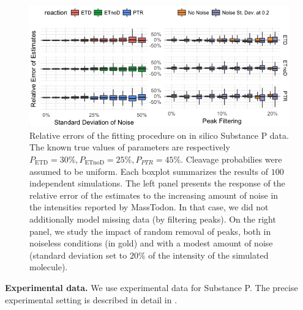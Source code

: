 \documentclass{llncs}
\begin{document}
        \begin{figure}[h]
                \center
                \includegraphics[width=\textwidth]{kokos.png}
                \caption{ Relative errors of the fitting procedure on in silico Substance P data. The known true values of parameters are respectively $P_\text{ETD}=30\%, P_\text{ETnoD}= 25\%, P_{PTR}= 45\%$. Cleavage probabilies were assumed to be uniform. Each boxplot summarizes the results of $100$ independent simulations. The left panel presents the response of the relative error of the estimates to the increasing amount of noise in the intensities reported by MassTodon. In that case, we did not additionally model missing data (by filtering peaks). On the right panel, we study the impact of random removal of peaks, both in noiseless conditions (in gold) and with a modest amount of noise (standard deviation set to $20\%$ of the intensity of the simulated molecule).
                }\label{fig::kokos}
        \end{figure}


        \textbf{Experimental data.}
        We use experimental data for Substance P. The precise experimental setting is described in detail in \cite{Lermyte2015-eb}.
\end{document}

